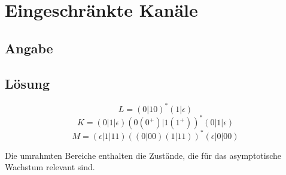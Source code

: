 \section*{Eingeschränkte Kanäle}
\subsection*{Angabe}


\subsection*{Lösung}
\begin{flushenum}
\item
  \[ L = (0 | 10)^* (1 | \epsilon) \]
  \[ K = (0 | 1 | \epsilon) (0 (0^+) | 1 (1^+))^* (0 | 1 | \epsilon) \]
  \[ M = (\epsilon | 1 | 11) ((0 | 00) (1 | 11))^* (\epsilon | 0 | 00) \]

\item
  Die umrahmten Bereiche enthalten die Zustände, die für
  das asymptotische Wachstum relevant sind.


\end{flushenum}
